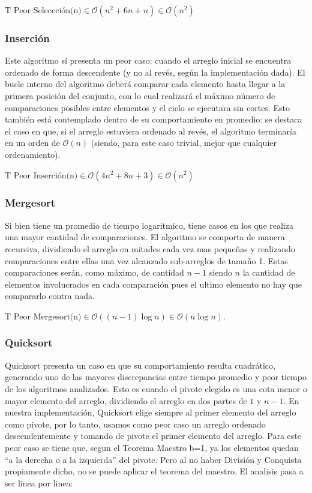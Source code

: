 \documentclass[article,a4paper]{article}
\begin{document}
$\mbox{T Peor Seleccción(n)} \in \mathcal O(n^2 + 6n + n) \in \mathcal O(n^2)$ 


\subsubsection{Inserción}

Este algoritmo sí presenta un peor caso: cuando el arreglo inicial se encuentra ordenado de forma descendente (y no al revés, según la implementación dada). El bucle interno del algoritmo deberá comparar cada elemento hasta llegar a la primera posición del conjunto, con lo cual realizará el máximo número de comparaciones posibles entre elementos y el ciclo se ejecutara sin cortes. Esto también está contemplado dentro de su comportamiento en promedio: se destaca el caso en que, si el arreglo estuviera ordenado al revés, el algoritmo terminaría en un orden de $\mathcal O(n)$ (siendo, para este caso trivial, mejor que cualquier ordenamiento).

$\mbox{T Peor Inserción(n)} \in \mathcal O(4n^2 + 8n + 3) \in \mathcal O(n^2)$

\subsubsection{Mergesort}

Si bien tiene un promedio de tiempo logaritmico, tiene casos en los que realiza una mayor cantidad de comparaciones. El algoritmo se comporta de manera recursiva, dividiendo el arreglo en mitades cada vez mas pequeñas y realizando comparaciones entre ellas una vez alcanzado sub-arreglos de tamaño 1. Estas comparaciones serán, como máximo, de cantidad $n-1$ siendo $n$ la cantidad de elementos involucrados en cada comparación pues el ultimo elemento no hay que compararlo contra nada. 

$\mbox{T Peor Mergesort(n)} \in \mathcal O((n-1) \log n) \in \mathcal O(n \log n)$. 

\subsubsection{Quicksort}

Quicksort presenta un caso en que su comportamiento resulta cuadrático, generando uno de las mayores discrepancias entre tiempo promedio y peor tiempo de los algoritmos analizados. Esto es cuando el pivote elegido es una cota menor o mayor elemento del arreglo, dividiendo el arreglo en dos partes de $1$ y $n-1$. En nuestra implementación, Quicksort elige siempre al primer elemento del arreglo como pivote, por lo tanto, usamos como peor caso un arreglo ordenado descendentemente y tomando de pivote el primer elemento del arreglo. Para este peor caso se tiene que, segun el Teorema Maestro b=1, ya los elementos quedan “a la derecha o a la izquierda” del pivote. Pero al no haber División y Conquista propiamente dicho, no se puede aplicar el teorema del maestro. El analisis pasa a ser linea por linea: 
\end{document}
